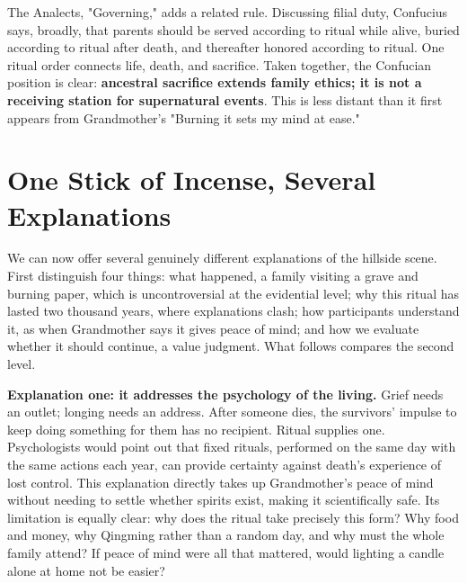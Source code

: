 The Analects, "Governing," adds a related rule. Discussing filial duty, Confucius says, broadly, that parents should be served according to ritual while alive, buried according to ritual after death, and thereafter honored according to ritual. One ritual order connects life, death, and sacrifice. Taken together, the Confucian position is clear: \textbf{ancestral sacrifice extends family ethics; it is not a receiving station for supernatural events}. This is less distant than it first appears from Grandmother's "Burning it sets my mind at ease."

\section{One Stick of Incense, Several Explanations}
We can now offer several genuinely different explanations of the hillside scene. First distinguish four things: what happened, a family visiting a grave and burning paper, which is uncontroversial at the evidential level; why this ritual has lasted two thousand years, where explanations clash; how participants understand it, as when Grandmother says it gives peace of mind; and how we evaluate whether it should continue, a value judgment. What follows compares the second level.

\textbf{Explanation one: it addresses the psychology of the living.} Grief needs an outlet; longing needs an address. After someone dies, the survivors' impulse to keep doing something for them has no recipient. Ritual supplies one. Psychologists would point out that fixed rituals, performed on the same day with the same actions each year, can provide certainty against death's experience of lost control. This explanation directly takes up Grandmother's peace of mind without needing to settle whether spirits exist, making it scientifically safe. Its limitation is equally clear: why does the ritual take precisely this form? Why food and money, why Qingming rather than a random day, and why must the whole family attend? If peace of mind were all that mattered, would lighting a candle alone at home not be easier?

